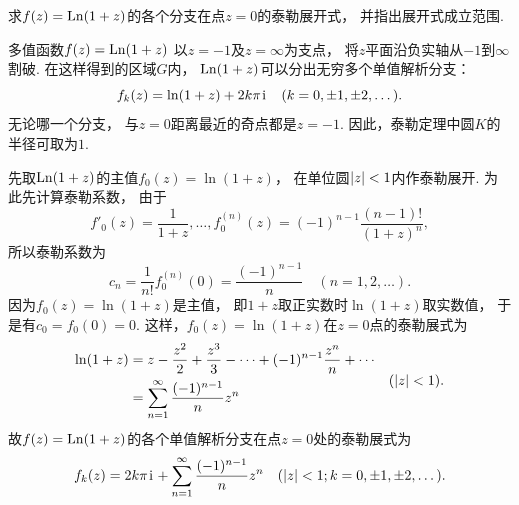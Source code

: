 \begin{example}
求\(f(z) = \operatorname{Ln}(1+z)\)的各个分支在点\(z = 0\)的泰勒展开式，
并指出展开式成立范围.
\begin{solution}
多值函数\(f(z) = \operatorname{Ln}(1+z)\)
以\(z = -1\)及\(z = \infty\)为支点，
将\(z\)平面沿负实轴从\(-1\)到\(\infty\)割破.
在这样得到的区域\(G\)内，
\(\operatorname{Ln}(1+z)\)可以分出无穷多个单值解析分支：\begin{equation*}
	f_k(z) = \ln(1+z) + 2k\pi\kern1pt\mathrm{i}\kern1pt
	\quad(k=0,\pm1,\pm2,\dotsc).
\end{equation*}
无论哪一个分支，
与\(z = 0\)距离最近的奇点都是\(z = -1\).
因此，泰勒定理中圆\(K\)的半径可取为\(1\).

先取\(\operatorname{Ln}(1+z)\)的主值\(f_0(z) = \ln(1+z)\)，
在单位圆\(\abs{z}<1\)内作泰勒展开.
为此先计算泰勒系数，
由于\begin{equation*}
	f'_0(z) = \frac1{1+z},
	\dotsc,
	f^{(n)}_0(z) = (-1)^{n-1} \frac{(n-1)!}{(1+z)^n},
\end{equation*}
所以泰勒系数为\begin{equation*}
	c_n = \frac1{n!} f^{(n)}_0(0) = \frac{(-1)^{n-1}}{n}
	\quad(n=1,2,\dotsc).
\end{equation*}
因为\(f_0(z) = \ln(1+z)\)是主值，
即\(1+z\)取正实数时\(\ln(1+z)\)取实数值，
于是有\(c_0 = f_0(0) = 0\).
这样，\(f_0(z) = \ln(1+z)\)在\(z = 0\)点的泰勒展式为
\begin{equation}\label{equation:解析函数的级数表示.对数函数的泰勒展式}
	\begin{split}
		\ln(1+z)
		&= z
		- \frac{z^2}{2}
		+ \frac{z^3}{3}
		- \dotsb
		+ (-1)^{n-1} \frac{z^n}{n}
		+ \dotsb \\
		&= \sum_{n=1}^\infty \frac{(-1)^{n-1}}{n} z^n
	\end{split}
	\quad (\abs{z} < 1).
\end{equation}
故\(f(z) = \operatorname{Ln}(1+z)\)的各个单值解析分支在点\(z = 0\)处的泰勒展式为\begin{equation*}
	f_k(z) = 2k\pi\kern1pt\mathrm{i}\kern1pt + \sum_{n=1}^\infty \frac{(-1)^{n-1}}{n} z^n
	\quad (\abs{z} < 1; k=0,\pm1,\pm2,\dotsc).
\end{equation*}
\end{solution}
\end{example}


